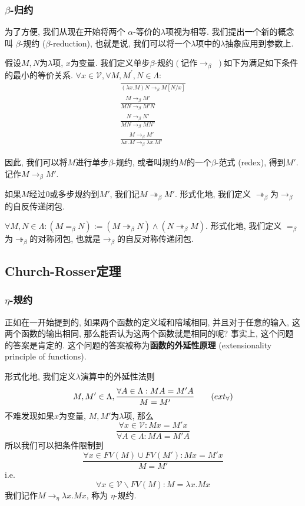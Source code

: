 \subsubsection{\texorpdfstring{$\beta$}{beta}-归约}
为了方便, 我们从现在开始将两个 $\alpha$-等价的$\lambda$项视为相等. 我们提出一个新的概念叫 $\beta$-规约 ($\beta$-reduction), 也就是说, 我们可以将一个$\lambda$项中的$\lambda$抽象应用到参数上. 
\begin{definition}
    假设$M, N$为$\lambda$项, $x$为变量. 我们定义单步$\beta$-规约$\left(\right.$记作$\to_\beta$ $\left.\right)$如下为满足如下条件的最小的等价关系. $\forall x\in \mathcal V, \forall M, M^\prime, N\in \Lambda$:%
    \begin{gather}
        \frac{ }{(\lambda x.M)N \to_\beta M[N/x]} \tag{$\beta$}\\
        \frac{M \to_\beta{M'}}{MN \to_\beta{M'}N}\tag{cong1}\\
        \frac{N \to_\beta{N'}}{MN \to_\beta{M}N'}\tag{cong2} \\
        \frac{M \to_\beta{M'}}{\lambda{x}.M \to_\beta\lambda{x}.M'}\tag{$\xi$}
    \end{gather}
\end{definition}
因此, 我们可以将$M$进行单步$\beta$-规约, 或者叫规约$M$的一个$\beta$-范式 (redex), 得到$M'$. 记作$M\to_\beta M'$.
\begin{definition}
    如果$M$经过0或多步规约到$M'$, 我们记$M\twoheadrightarrow_\beta M'$. 形式化地, 我们定义 $\twoheadrightarrow_\beta$为$\to_\beta$的自反传递闭包.
\end{definition}
\begin{definition}
    $\forall M, N \in \Lambda: (M=_\beta N):=(M\twoheadrightarrow_\beta N)\land (N\twoheadrightarrow_\beta M)$. 形式化地, 我们定义 $=_\beta$为$\twoheadrightarrow_\beta$的对称闭包, 也就是$\to_\beta$的自反对称传递闭包.
\end{definition}

\subsection{\textbf{Church-Rosser}定理}
\subsubsection{\texorpdfstring{$\eta$}{eta}-规约}
正如在一开始提到的, 如果两个函数的定义域和陪域相同, 并且对于任意的输入, 这两个函数的输出相同, 那么能否认为这两个函数就是相同的呢? 事实上, 这个问题的答案是肯定的. 这个问题的答案被称为\textbf{函数的外延性原理} (extensionality principle of functions). 
\begin{definition}
    形式化地, 我们定义$\lambda$演算中的外延性法则 
    \[
        M,M' \in \Lambda, \frac{\forall A\in \Lambda:MA=M'A}{M=M'}\tag{$ext_{\forall}$}
    \]
    不难发现如果$x$为变量, $M, M'$为$\lambda$项, 那么
    \[
        \frac{\forall x\in \mathcal V: Mx=M'x}{\forall A \in \Lambda: MA=M'A}
    \]
    所以我们可以把条件限制到
    \[
        \frac{\forall x\in FV(M)\cup FV(M'): Mx=M'x}{M=M'}\tag{$ext$}
    \]
    i.e.
    \[
        \forall x \in \mathcal{V}\backslash FV(M): M=\lambda{x}.Mx \tag{$\eta$}
    \]
    我们记作$M\to_\eta \lambda x.Mx$, 称为 $\eta$-规约. 
\end{definition}

